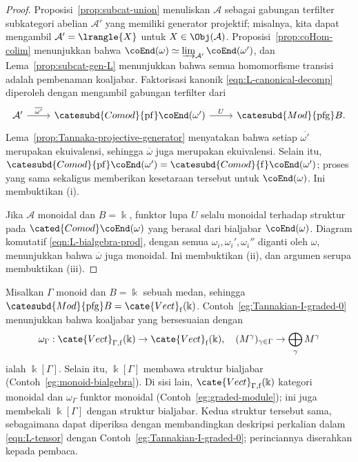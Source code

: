 \begin{proof}
	Proposisi~\ref{prop:subcat-union} menuliskan $\mathcal{A}$ sebagai
	gabungan terfilter subkategori abelian $\mathcal{A}'$ yang memiliki
	generator projektif; misalnya, kita dapat mengambil
	$\mathcal{A}'=\lrangle{X}$ untuk $X\in\Obj(\mathcal{A})$.
	Proposisi~\ref{prop:coHom-colim} menunjukkan bahwa
	$\coEnd(\omega)\simeq\varinjlim_{\mathcal{A}'}\coEnd(\omega')$, dan
	Lema~\ref{prop:subcat-gen-L} menunjukkan bahwa semua homomorfisme
	transisi adalah pembenaman koaljabar. Faktorisasi kanonik
	\eqref{eqn:L-canonical-decomp} diperoleh dengan mengambil gabungan
	terfilter dari
	\[\begin{tikzcd}
		\mathcal{A}' \arrow[r, "{\overline{\omega'}}"] & \catesubd{Comod}{\mathrm{pf}}\coEnd(\omega') \arrow[r, "U"] & \catesubd{Mod}{\mathrm{pfg}}B.
	\end{tikzcd}\]
	Lema~\ref{prop:Tannaka-projective-generator} menyatakan bahwa setiap
	$\overline{\omega'}$ merupakan ekuivalensi, sehingga $\overline\omega$ juga
	merupakan ekuivalensi. Selain itu,
	$\catesubd{Comod}{\mathrm{pf}}\coEnd(\omega')=
	\catesubd{Comod}{\mathrm f}\coEnd(\omega')$; proses yang sama sekaligus
	memberikan kesetaraan tersebut untuk $\coEnd(\omega)$. Ini membuktikan
	(i).

	Jika $\mathcal{A}$ monoidal dan $B=\Bbbk$, funktor lupa $U$ selalu
	monoidal terhadap struktur pada $\cated{Comod}\coEnd(\omega)$ yang
	berasal dari bialjabar $\coEnd(\omega)$. Diagram komutatif
	\eqref{eqn:L-bialgebra-prod}, dengan semua
	$\omega_i,\omega_i',\omega_i''$ diganti oleh $\omega$, menunjukkan bahwa
	$\overline\omega$ juga monoidal. Ini membuktikan (ii), dan argumen serupa
	membuktikan (iii).
\end{proof}

\begin{example}\label{eg:Tannakian-I-graded}
	Misalkan $\Gamma$ monoid dan $B=\Bbbk$ sebuah medan, sehingga
	$\catesubd{Mod}{\mathrm{pfg}}B=\cate{Vect}_{\mathrm f}(\Bbbk)$.
	Contoh~\ref{eg:Tannakian-I-graded-0} menunjukkan bahwa koaljabar yang
	bersesuaian dengan
	\[ \omega_\Gamma: \cate{Vect}_{\Gamma, \mathrm{f}}(\Bbbk) \to \cate{Vect}_{\mathrm{f}}(\Bbbk), \quad (M^\gamma)_{\gamma \in \Gamma} \to \bigoplus_\gamma M^\gamma \]
	ialah $\Bbbk[\Gamma]$. Selain itu, $\Bbbk[\Gamma]$ membawa
	struktur bialjabar (Contoh~\ref{eg:monoid-bialgebra}). Di sisi lain,
	$\cate{Vect}_{\Gamma,\mathrm f}(\Bbbk)$ kategori monoidal dan
	$\omega_\Gamma$ funktor monoidal (Contoh~\ref{eg:graded-module}); ini
	juga membekali $\Bbbk[\Gamma]$ dengan struktur bialjabar. Kedua struktur
	tersebut sama, sebagaimana dapat diperiksa dengan membandingkan deskripsi
	perkalian dalam \eqref{eqn:L-tensor} dengan
	Contoh~\ref{eg:Tannakian-I-graded-0}; perinciannya diserahkan kepada
	pembaca.
\end{example}
